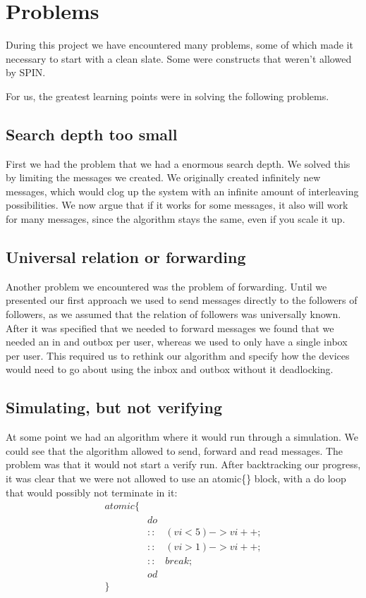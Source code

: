 \documentclass[10pt,a4paper]{article}
\begin{document}
	\section{Problems}
	
	During this project we have encountered many problems, some of which made it necessary to start with a clean slate. Some were constructs that weren't allowed by SPIN.
	
	For us, the greatest learning points were in solving the following problems.
	
	\subsection{Search depth too small}
	First we had the problem that we had a enormous search depth. We solved this by limiting the messages we created. 
	We originally created infinitely new messages, which would clog up the system with an infinite amount of interleaving possibilities.
	We now argue that if it works for some messages, it also will work for many messages, since the algorithm stays the same, even if you scale it up.
	
	\subsection{Universal relation or forwarding}
	Another problem we encountered was the problem of forwarding.
	Until we presented our first approach we used to send messages directly to the followers of followers, as we assumed that the relation of followers was universally known. 
	After it was specified that we needed to forward messages we found that we needed an in and outbox per user, whereas we used to only have a single inbox per user.
	This required us to rethink our algorithm and specify how the devices would need to go about using the inbox and outbox without it deadlocking.
	
	\subsection{Simulating, but not verifying}
	At some point we had an algorithm where it would run through a simulation. 
	We could see that the algorithm allowed to send, forward and read messages. 
	The problem was that it would not start a verify run.
	After backtracking our progress, it was clear that we were not allowed to use an atomic\{\} block, with a do loop that would possibly not terminate in it:
	\begin{align*}
	atomic \{ & & \\
	&do & \\
	&:: & (vi < 5) -> vi++; \\
	&:: & (vi > 1) -> vi++;  \\
	&:: & break; \\
	& od & \\
	\} & &
	\end{align*}
	
\end{document}
